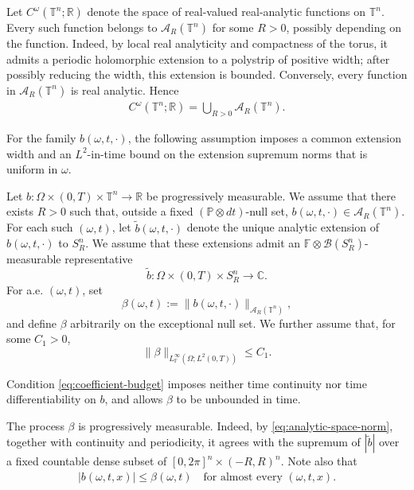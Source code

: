 \documentclass[print,wide]{draft}
\begin{document}
Let \(C^\omega(\mathbb T^n;\mathbb R)\) denote the space of real-valued real-analytic functions on \(\mathbb T^n\). Every such function belongs to \(\mathcal A_R(\mathbb T^n)\) for some \(R>0\), possibly depending on the function. Indeed, by local real analyticity and compactness of the torus, it admits a periodic holomorphic extension to a polystrip of positive width; after possibly reducing the width, this extension is bounded. Conversely, every function in \(\mathcal A_R(\mathbb T^n)\) is real analytic. Hence
\begin{align*}
C^\omega(\mathbb T^n;\mathbb R)
=\bigcup_{R>0}\mathcal A_R(\mathbb T^n).
\end{align*}

For the family \(b(\omega,t,\cdot)\), the following assumption imposes a common extension width and an \(L^2\)-in-time bound on the extension supremum norms that is uniform in \(\omega\).

\begin{assumption}
\label{ass:analytic-coefficient}
Let \(b:\Omega\times(0,T)\times\mathbb T^n\to\mathbb R\) be progressively measurable. We assume that there exists \(R>0\) such that, outside a fixed \((\mathbb P\otimes dt)\)-null set, \(b(\omega,t,\cdot)\in\mathcal A_R(\mathbb T^n)\).
For each such \((\omega,t)\), let \(\widetilde b(\omega,t,\cdot)\) denote the unique analytic extension of \(b(\omega,t,\cdot)\) to \(S_R^n\). We assume that these extensions admit an \(\mathbb F\otimes\mathcal B(S_R^n)\)-measurable representative
\[
\widetilde b:\Omega\times(0,T)\times S_R^n\to\mathbb C.
\]
For a.e. \((\omega,t)\), set
\begin{equation}\label{eq:beta-definition}
\beta(\omega,t):=\|b(\omega,t,\cdot)\|_{\mathcal A_R(\mathbb T^n)},
\end{equation}
and define \(\beta\) arbitrarily on the exceptional null set. We further assume that, for some \(C_1>0\),
\begin{equation}\label{eq:coefficient-budget}
\|\beta\|_{L^\infty_{\mathbb F}(\Omega;L^2(0,T))}\le C_1.
\end{equation}
\end{assumption}
%

%
\begin{remark}
Condition \eqref{eq:coefficient-budget} imposes neither time continuity nor time differentiability on \(b\), and allows \(\beta\) to be unbounded in time.
\end{remark}
%

The process \(\beta\) is progressively measurable.
Indeed, by \eqref{eq:analytic-space-norm}, together with continuity and periodicity, it agrees with the supremum of \(|\widetilde b|\) over a fixed countable dense subset of \([0,2\pi]^n\times(-R,R)^n\). Note also that
\begin{align}\label{eq:real-axis-bound}
|b(\omega,t,x)|\le\beta(\omega,t)
\quad\text{for almost every }(\omega,t,x).
\end{align}
\end{document}
